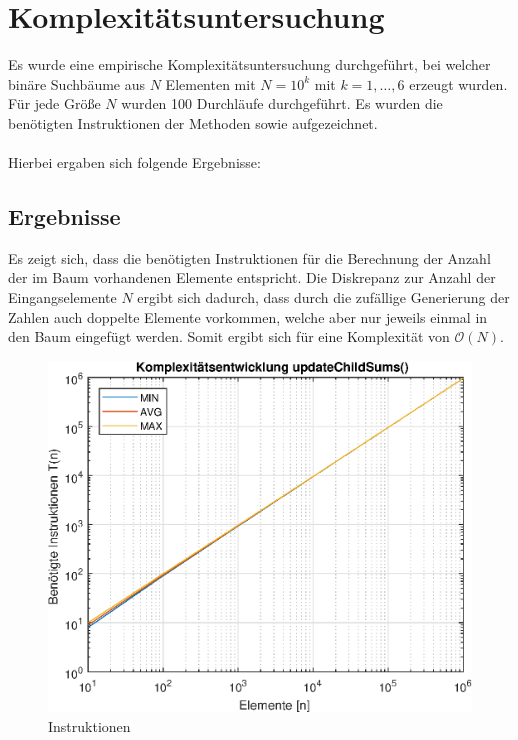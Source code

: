\documentclass[paper=a4, fontsize=12pt]{article}
\begin{document}
\newpage
\section{Komplexitätsuntersuchung}
Es wurde eine empirische Komplexitätsuntersuchung durchgeführt, bei welcher binäre Suchbäume aus $N$ Elementen mit $N = 10^k$ mit $k = 1,\ldots,6$ erzeugt wurden. Für jede Größe $N$ wurden 100 Durchläufe durchgeführt. Es wurden die benötigten Instruktionen der Methoden  sowie  aufgezeichnet.\\
\\
Hierbei ergaben sich folgende Ergebnisse:

\subsection{Ergebnisse }

Es zeigt sich, dass die benötigten Instruktionen für die Berechnung der Anzahl der im Baum vorhandenen Elemente entspricht. Die Diskrepanz zur Anzahl der Eingangselemente $N$ ergibt sich dadurch, dass durch die zufällige Generierung der Zahlen auch doppelte Elemente vorkommen, welche aber nur jeweils einmal in den Baum eingefügt werden. Somit ergibt sich für  eine Komplexität von $\mathcal{O}(N)$.

\begin{figure}[H]
	\centering
	\includegraphics[scale=1]{komplexitaetsentwicklung_updateChildSums.eps}
	\caption{Instruktionen }
\end{figure}
\end{document}
